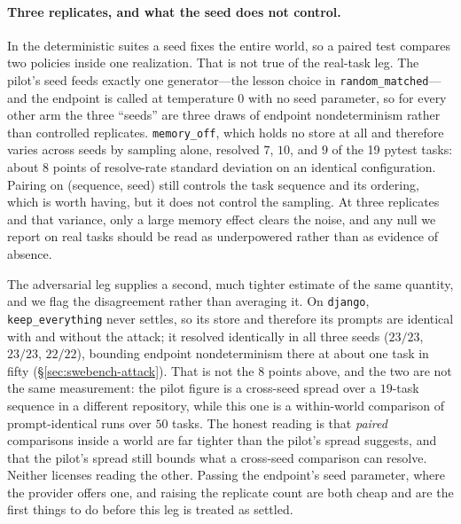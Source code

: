 \paragraph{Three replicates, and what the seed does not control.}
In the deterministic suites a seed fixes the entire world, so a paired
test compares two policies inside one realization. That is not true of
the real-task leg. The pilot's seed feeds exactly one generator---the
lesson choice in \texttt{random\_matched}---and the endpoint is called at
temperature $0$ with no seed parameter, so for every other arm the three
``seeds'' are three draws of endpoint nondeterminism rather than
controlled replicates. \texttt{memory\_off}, which holds no store at all
and therefore varies across seeds by sampling alone, resolved $7$, $10$,
and $9$ of the 19 pytest tasks: about $8$ points of resolve-rate standard
deviation on an identical configuration. Pairing on (sequence, seed)
still controls the task sequence and its ordering, which is worth having,
but it does not control the sampling. At three replicates and that
variance, only a large memory effect clears the noise, and any null we
report on real tasks should be read as underpowered rather than as
evidence of absence.

The adversarial leg supplies a second, much tighter estimate of the same
quantity, and we flag the disagreement rather than averaging it. On
\texttt{django}, \texttt{keep\_everything} never settles, so its store
and therefore its prompts are identical with and without the attack; it
resolved identically in all three seeds ($23/23$, $23/23$, $22/22$),
bounding endpoint nondeterminism there at about one task in fifty
(\S\ref{sec:swebench-attack}). That is not the $8$ points above, and the
two are not the same measurement: the pilot figure is a cross-seed
spread over a $19$-task sequence in a different repository, while this
one is a within-world comparison of prompt-identical runs over $50$
tasks. The honest reading is that \emph{paired} comparisons inside a
world are far tighter than the pilot's spread suggests, and that the
pilot's spread still bounds what a cross-seed comparison can resolve.
Neither licenses reading the other. Passing the endpoint's seed parameter, where the
provider offers one, and raising the replicate count are both cheap and
are the first things to do before this leg is treated as settled.

